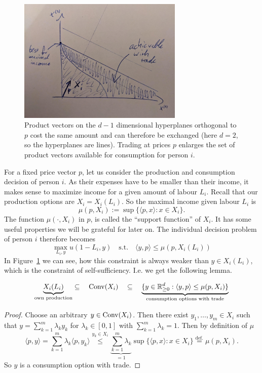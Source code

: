 \begin{figure}
	\centering
	\includegraphics[width=0.7\textwidth]{images/consumption_increase_by_trade.jpeg}
	\caption{
		Product vectors on the \(d-1\) dimensional hyperplanes orthogonal to \(p\)
		cost the same amount and can therefore be exchanged (here \(d=2\), so the
		hyperplanes are lines). Trading at prices \(p\) enlarges the set of
		product vectors available for consumption for person \(i\).
	}
	\label{fig: consumption increase by trade}
\end{figure}
For a fixed price vector \(p\), let us consider the production and consumption
decision of person \(i\). As their expenses have to be smaller than their
income, it makes sense to maximize income for a given amount of labour \(L_i\).
Recall that our production options are \(X_i=X_i(L_i)\). So the maximal income
given labour \(L_i\) is
\[
	\tag{income}\label{eq: income}
	\mu(p, X_i) := \sup\{\langle p, x\rangle : x\in X_i\}.
\]
The function \(\mu(\cdot, X_i)\) in \(p\), is called the ``support function'' of
\(X_i\). It has some useful properties we will be grateful for later on. The
individual decision problem of person \(i\) therefore becomes
\begin{equation}
	\tag{IDP}
	\label{eq: individual decision problem}
	\max_{L_i, y} u(1-L_i, y) \quad\text{s.t.}\quad
	\langle y, p\rangle \le \mu(p, X_i(L_i))
\end{equation}
In Figure~\ref{fig: consumption increase by trade} we can see, how this
constraint is always weaker than \(y\in X_i(L_i)\), which is the constraint of
self-sufficiency. I.e. we get the following lemma.

\begin{lemma}
\[
	\underbrace{X_i(L_i)}_{\text{own production}}
	\subseteq \quad \operatorname{Conv}(X_i)\quad
	\subseteq \quad
	\underbrace{
		\{y\in\mathbb{R}_{\ge 0}^d: \langle y, p\rangle \le \mu(p, X_i)\}
	}_{\text{consumption options with trade}}
\]
\end{lemma}
\begin{proof}
	Choose an arbitrary \(y\in \operatorname{Conv}(X_i)\). Then there exist \(y_1,\dots, y_m\in X_i\)
	such that \(y=\sum_{k=1}^m \lambda_k y_k\) for \(\lambda_k\in[0,1]\) with
	\(\sum_{k=1}^{m}\lambda_k=1\). Then by definition of \(\mu\)
	\[
		\langle p, y\rangle
		= \sum_{k=1}^m \lambda_k\langle p, y_k\rangle
		\overset{y_k\in X_i}\le \underbrace{\sum_{k=1}^m \lambda_k}_{=1}
		\sup\{\langle p, x\rangle : x\in X_i\}
		\overset{\text{def.}}= \mu(p, X_i).
	\]
	So \(y\) is a consumption option with trade.
\end{proof}

